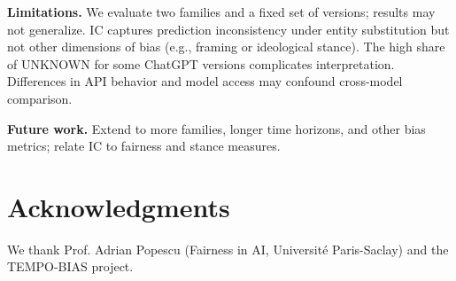 \textbf{Limitations.} We evaluate two families and a fixed set of versions; results may not generalize. IC captures prediction inconsistency under entity substitution but not other dimensions of bias (e.g., framing or ideological stance). The high share of UNKNOWN for some ChatGPT versions complicates interpretation. Differences in API behavior and model access may confound cross-model comparison.

\textbf{Future work.} Extend to more families, longer time horizons, and other bias metrics; relate IC to fairness and stance measures.

\section*{Acknowledgments}
We thank Prof. Adrian Popescu (Fairness in AI, Université Paris-Saclay) and the TEMPO-BIAS project.





